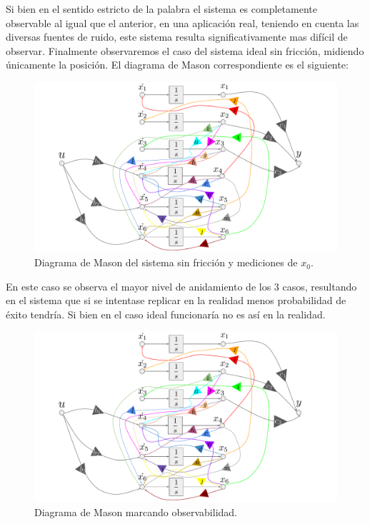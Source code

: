 Si bien en el sentido estricto de la palabra el sistema es completamente observable al igual que el anterior, en una aplicación real, teniendo en cuenta las diversas fuentes de ruido, este sistema resulta significativamente mas difícil de observar.
Finalmente observaremos el caso del sistema ideal sin fricción, midiendo únicamente la posición. El diagrama de Mason correspondiente es el siguiente:
\begin{figure}[H]
	\centering
	\includegraphics[width=1\linewidth,page = 6]{../Modelo Teorico/ImagenesModelo Teorico/Mason.pdf}
	\caption{Diagrama de Mason del sistema sin fricción y mediciones de $x_0$.}	
	\label{fig:masonsisyxom}
\end{figure}
En este caso se observa el mayor nivel de anidamiento de los 3 casos, resultando en el sistema que si se intentase replicar en la realidad menos probabilidad de éxito tendría. Si bien en el caso ideal funcionaría no es así en la realidad.
\begin{figure}[H]
	\centering
	\includegraphics[width=1\linewidth,page = 7]{../Modelo Teorico/ImagenesModelo Teorico/Mason.pdf}
	\caption{Diagrama de Mason marcando observabilidad.}	
	\label{fig:masonsisyxomO}
\end{figure}

%
